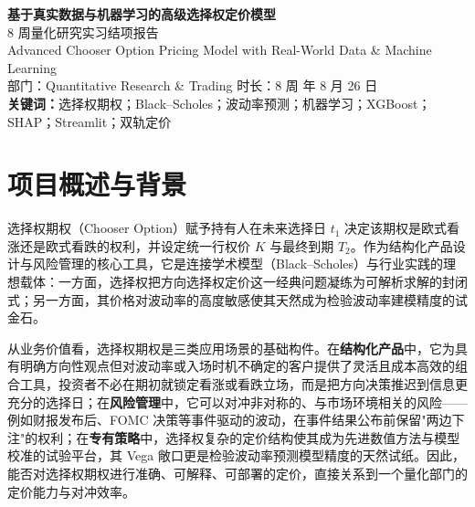\documentclass[11pt,a4paper]{article}
\begin{document}
\begin{center}
{\LARGE\bfseries 基于真实数据与机器学习的高级选择权定价模型}\\[0.25em]
{\Large 8 周量化研究实习结项报告}\\[0.3em]
{\large Advanced Chooser Option Pricing Model with Real-World Data \& Machine Learning}\\[0.4em]
{\small 部门：Quantitative Research \& Trading \quad\textbar\quad 时长：8 周 \quad\textbar{} 年 8 月 26 日}\\[0.4em]
{\small \textbf{关键词：}选择权期权；Black--Scholes；波动率预测；机器学习；XGBoost；SHAP；Streamlit；双轨定价}
\end{center}

\begin{center}
\end{center}

\section{项目概述与背景}

选择权期权（Chooser Option）赋予持有人在未来选择日 $t_1$ 决定该期权是欧式看涨还是欧式看跌的权利，并设定统一行权价 $K$ 与最终到期 $T_2$。作为结构化产品设计与风险管理的核心工具，它是连接学术模型（Black--Scholes）与行业实践的理想载体：一方面，选择权把方向选择权定价这一经典问题凝练为可解析求解的封闭式；另一方面，其价格对波动率的高度敏感使其天然成为检验波动率建模精度的试金石。

从业务价值看，选择权期权是三类应用场景的基础构件。在\textbf{结构化产品}中，它为具有明确方向性观点但对波动率或入场时机不确定的客户提供了灵活且成本高效的组合工具，投资者不必在期初就锁定看涨或看跌立场，而是把方向决策推迟到信息更充分的选择日；在\textbf{风险管理}中，它可以对冲非对称的、与市场环境相关的风险——例如财报发布后、FOMC 决策等事件驱动的波动，在事件结果公布前保留"两边下注"的权利；在\textbf{专有策略}中，选择权复杂的定价结构使其成为先进数值方法与模型校准的试验平台，其 Vega 敞口更是检验波动率预测模型精度的天然试纸。因此，能否对选择权期权进行准确、可解释、可部署的定价，直接关系到一个量化部门的定价能力与对冲效率。
\end{document}
